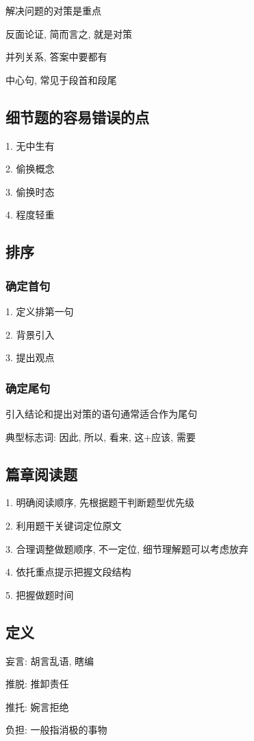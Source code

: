 \documentclass[UTF8]{ctexart}
\begin{document}
解决问题的对策是重点

反面论证, 简而言之, 就是对策

并列关系, 答案中要都有

中心句, 常见于段首和段尾


\subsection{细节题的容易错误的点}
1. 无中生有

2. 偷换概念

3. 偷换时态

4. 程度轻重

\subsection{排序}

\subsubsection{确定首句}
1. 定义排第一句

2. 背景引入

3. 提出观点

\subsubsection{确定尾句}

引入结论和提出对策的语句通常适合作为尾句

典型标志词: 因此, 所以, 看来, 这+应该, 需要

\subsection{篇章阅读题}
1. 明确阅读顺序, 先根据题干判断题型优先级

2. 利用题干关键词定位原文

3. 合理调整做题顺序, 不一定位, 细节理解题可以考虑放弃

4. 依托重点提示把握文段结构

5. 把握做题时间

\subsection{定义}

妄言: 胡言乱语, 瞎编

推脱: 推卸责任

推托: 婉言拒绝

负担: 一般指消极的事物
\end{document}
